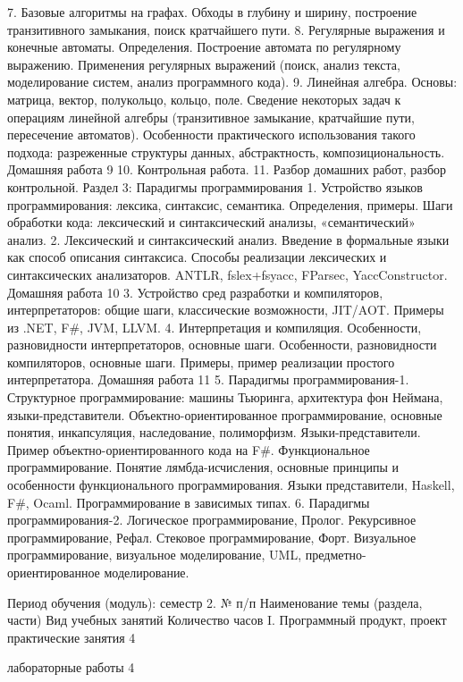     7. Базовые алгоритмы на графах. Обходы в глубину и ширину, построение транзитивного замыкания, поиск кратчайшего пути.
    8. Регулярные выражения и конечные автоматы. Определения. Построение автомата по регулярному выражению. Применения регулярных выражений (поиск, анализ текста, моделирование систем, анализ программного кода).
    9. Линейная алгебра. Основы: матрица, вектор, полукольцо, кольцо, поле. Сведение некоторых задач к операциям линейной алгебры (транзитивное замыкание, кратчайшие пути, пересечение автоматов). Особенности практического использования такого подхода: разреженные структуры данных, абстрактность, композициональность.
Домашняя работа 9
    10. Контрольная работа.
    11. Разбор домашних работ, разбор контрольной.
Раздел 3: Парадигмы программирования
    1. Устройство языков программирования: лексика, синтаксис, семантика. Определения, примеры. Шаги обработки кода: лексический и синтаксический анализы, «семантический» анализ.
    2. Лексический и синтаксический анализ. Введение в формальные языки как способ описания синтаксиса. Способы реализации лексических и синтаксических анализаторов. ANTLR, fslex+fsyacc, FParsec, YaccConstructor.
Домашняя работа 10
    3. Устройство сред разработки и компиляторов, интерпретаторов: общие шаги, классические возможности, JIT/AOT. Примеры из .NET, F#, JVM, LLVM.
    4. Интерпретация и компиляция. Особенности, разновидности интерпретаторов, основные шаги.  Особенности, разновидности компиляторов, основные шаги. Примеры, пример реализации простого интерпретатора.
Домашняя работа 11 
    5. Парадигмы программирования-1. Структурное программирование: машины Тьюринга, архитектура фон Неймана, языки-представители. Объектно-ориентированное программирование, основные понятия, инкапсуляция, наследование, полиморфизм. Языки-представители. Пример объектно-ориентированного кода на F#. Функциональное программирование. Понятие лямбда-исчисления, основные принципы и особенности функционального программирования. Языки представители, Haskell, F#, Ocaml. Программирование в зависимых типах.
    6. Парадигмы программирования-2. Логическое программирование, Пролог. Рекурсивное программирование, Рефал. Стековое программирование, Форт. Визуальное программирование, визуальное моделирование, UML, предметно-ориентированное моделирование.

Период обучения (модуль): семестр 2.
№ п/п
Наименование темы (раздела, части)
Вид учебных занятий
Количество часов
I.
Программный продукт, проект
практические занятия
4


лабораторные работы
4


